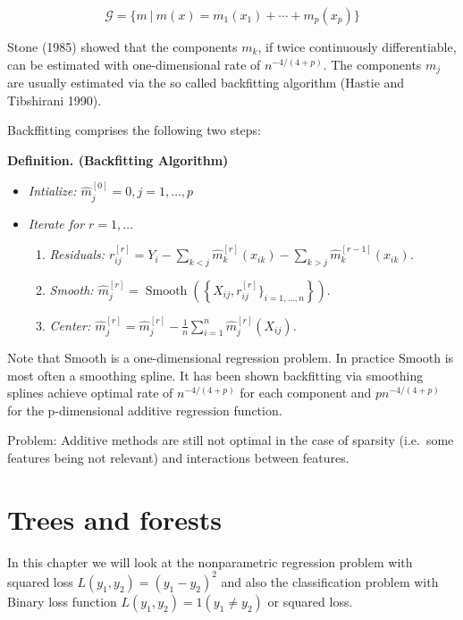 \documentclass[a4paper,10pt,openany]{book}
\providecommand{\tightlist}{%
 \setlength{\itemsep}{0pt}\setlength{\parskip}{0pt}}
\begin{document}
\[
\mathcal G=\{m\ |\ m(x)=m_1(x_1)+\cdots +m_p(x_p)\}
\]

Stone (1985) showed that the components \(m_k\), if twice continuously differentiable, can be estimated with one-dimensional rate of \(n^{-4/(4+p)}\). The components \(m_j\) are usually estimated via the so called backfitting algorithm (Hastie and Tibshirani 1990).

Backffitting comprises the following two steps:

\textbf{Definition. (Backfitting Algorithm)}

\begin{itemize}
\tightlist
\item
  \emph{Intialize: \(\hat m_j^{[0]}=0, j=1,\dots,p\)}
\item
  \emph{Iterate for \(r=1,\dots\)}

  \begin{enumerate}
  \def\labelenumi{\arabic{enumi}.}
  \tightlist
  \item
    \emph{Residuals: \(r_{ij}^{[r]}=Y_i-\sum_{k < j} \hat{m}_{k}^{[r]}(x_{ik})-\sum_{k > j} \hat{m}_{k}^{[r-1]}(x_{ik})\).}
  \item
    \emph{Smooth: \(\hat{m}_j^{[r]}=\operatorname{Smooth}\left(\left\{X_{ij},r_{ij}^{[r]}\}_{i=1,\dots,n}\right\}\right).\)}
  \item
    \emph{Center: \(\hat{m}_j^{[r]}=\hat{m}_j^{[r]}-\frac{1}{n} \sum_{i=1}^n \hat{m}_j^{[r]}\left(X_{i j}\right)\).}
  \end{enumerate}
\end{itemize}

Note that Smooth is a one-dimensional regression problem. In practice Smooth is most often a smoothing spline.
It has been shown backfitting via smoothing splines achieve optimal rate of \(n^{-4/(4+p)}\) for each component and \(pn^{-4/(4+p)}\) for the p-dimensional additive regression function.

Problem: Additive methods are still not optimal in the case of sparsity (i.e.~some features being not relevant) and interactions between features.

\hypertarget{trees-and-forests}{%
\section{Trees and forests}\label{trees-and-forests}}

In this chapter we will look at the nonparametric regression problem with squared loss \(L(y_1,y_2)=(y_1-y_2)^2\) and also the classification problem with Binary loss function \(L(y_1,y_2)= 1(y_1\neq y_2)\) or squared loss.
\end{document}
